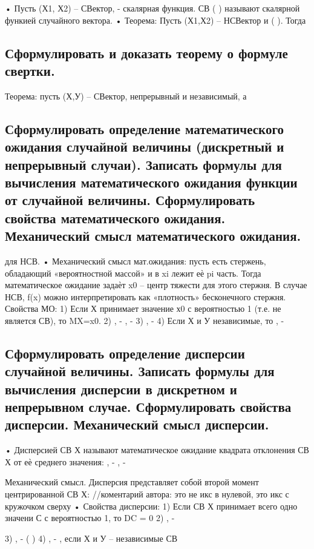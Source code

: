 • Пусть (Х1, Х2) – СВектор, - скалярная функция. СВ (
) называют скалярной функией случайного вектора.
• Теорема: Пусть (Х1,Х2) – НСВектор и ( ). Тогда


\subsection{Сформулировать и доказать теорему о формуле свертки.}

Теорема: пусть (Х,У) – СВектор, непрерывный и независимый, а




\subsection{Сформулировать определение математического ожидания случайной величины (дискретный и непрерывный случаи). Записать формулы для вычисления математического ожидания функции от случайной величины. Сформулировать свойства математического ожидания. Механический смысл математического ожидания.}



для НСВ.
• Механический смысл мат.ожидания: пусть есть стержень, обладающий «вероятностной массой» и в xi лежит еѐ pi часть. Тогда
математическое ожидание задаѐт x0 – центр тяжести для этого стержня. В случае НСВ, f(x) можно интерпретировать как «плотность»
бесконечного стержня.
Свойства МО:
1) Если Х принимает значение х0 с вероятностью 1 (т.е. не является СВ), то MX=x0.
2) , - , -
3) , -
4) Если Х и У независимые, то , - 

\subsection{Сформулировать определение дисперсии случайной величины. Записать формулы для вычисления дисперсии в дискретном и непрерывном случае. Сформулировать свойства дисперсии. Механический смысл дисперсии.}

• Дисперсией СВ Х называют математическое ожидание квадрата отклонения СВ Х от еѐ среднего значения: , - , -



Механический смысл. Дисперсия представляет собой второй момент центрированной СВ Х:
//коментарий автора: это не икс в
нулевой, это икс с кружочком сверху
• Свойства дисперсии:
1) Если СВ Х принимает всего одно значени С с вероятностью 1, то DC = 0
2) , -

3) ,
- (
)
4) , - , если Х и У – независимые СВ

